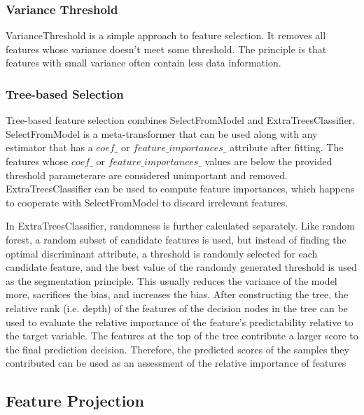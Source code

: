 \documentclass{article}
\begin{document}
\subsubsection{Variance Threshold}
\indent VarianceThreshold is a simple approach to feature selection. It removes all features whose variance doesn’t meet some threshold. The principle is that features with small variance often contain less data information.
\subsubsection{Tree-based Selection}
\indent Tree-based feature selection combines SelectFromModel and ExtraTreesClassifier. SelectFromModel is a meta-transformer that can be used along with any estimator that has a $coef\_$ or $feature\_importances\_$ attribute after fitting. The features whose $coef\_$ or $feature\_importances\_$ values are below the provided threshold parameterare are considered unimportant and removed. ExtraTreesClassifier can be used to compute feature importances, which happens to cooperate with SelectFromModel to discard irrelevant features.\par
\indent In ExtraTreesClassifier, randomness is further calculated separately. Like random forest, a random subset of candidate features is used, but instead of finding the optimal discriminant attribute, a threshold is randomly selected for each candidate feature, and the best value of the randomly generated threshold is used as the segmentation principle. This usually reduces the variance of the model more, sacrifices the bias, and increases the bias. After constructing the tree, the relative rank (i.e. depth) of the features of the decision nodes in the tree can be used to evaluate the relative importance of the feature's predictability relative to the target variable. The features at the top of the tree contribute a larger score to the final prediction decision. Therefore, the predicted scores of the samples they contributed can be used as an assessment of the relative importance of features

\subsection{Feature Projection}
\end{document}
